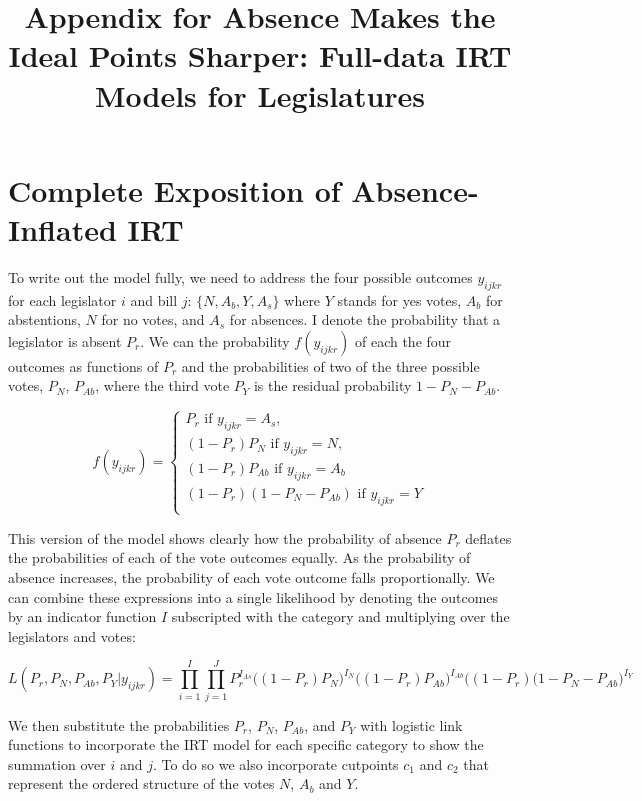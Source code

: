 %

\title{Appendix for Absence Makes the Ideal Points Sharper: Full-data IRT Models for Legislatures}
\usepackage{amsmath,amsthm, amssymb, latexsym}
\linespread{1.5}


	\maketitle
	\section*{Complete Exposition of Absence-Inflated IRT}
	
 To write out the model fully, we need to address the four possible outcomes $y_{ijkr}$ for each legislator $i$ and bill $j$: $\{N,A_b,Y,A_s\}$ where $Y$ stands for yes votes, $A_b$ for abstentions, $N$ for no votes, and $A_s$ for absences. I denote the probability that a legislator is absent $P_r$. We can the probability $f(y_{ijkr})$ of each the four outcomes as functions of $P_r$ and the probabilities of two of the three possible votes, $P_N$, $P_{Ab}$, where the third vote $P_Y$ is the residual probability $1 - P_N - P_{Ab}$.
 
 \[
 f(y_{ijkr}) = \begin{cases}
 P_r \text{ if } y_{ijkr}=A_s,\\
 (1-P_r)P_N \text{ if } y_{ijkr}=N,\\
 (1-P_r)P_{Ab} \text{ if } y_{ijkr}=A_b\\
 (1-P_r)(1-P_N-P_{Ab}) \text{ if } y_{ijkr} = Y\\
 \end{cases}
 \]
 
 This version of the model shows clearly how the probability of absence $P_r$ deflates the probabilities of each of the vote outcomes equally. As the probability of absence increases, the probability of each vote outcome falls proportionally. We can combine these expressions into a single likelihood by denoting the outcomes by an indicator function $I$ subscripted with the category and multiplying over the legislators and votes:
 
 \[
 L(P_r,P_N,P_{Ab},P_Y|y_{ijkr}) = \prod_{i=1}^{I} \prod_{j=1}^{J} P_r^{I_{As}} \big((1-P_r)P_N \big)^{I_N} \big((1-P_r)P_{Ab} \big)^{I_{Ab}} \big((1-P_r)(1-P_N-P_{Ab}\big)^{I_Y}
 \]
 
 We then substitute the probabilities $P_r$, $P_N$, $P_{Ab}$, and $P_Y$ with logistic link functions to incorporate the IRT model for each specific category to show the summation over $i$ and $j$. To do so we also incorporate cutpoints $c_1$ and $c_2$ that represent the ordered structure of the votes $N$, $A_b$ and $Y$. 
 

